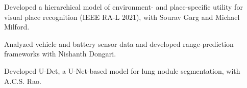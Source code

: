 \begin{cventry}
\begin{cvitems}
  \item Developed a hierarchical model of environment- and place-specific utility for visual place recognition (IEEE RA-L 2021), with Sourav Garg and Michael Milford.
\end{cvitems}
\end{cventry}

\begin{cventry}
\begin{cvitems}
  \item Analyzed vehicle and battery sensor data and developed range-prediction frameworks with Nishanth Dongari.
\end{cvitems}
\end{cventry}

\begin{cventry}
\begin{cvitems}
  \item Developed U-Det, a U-Net-based model for lung nodule segmentation, with A.C.S. Rao.
\end{cvitems}
\end{cventry}
